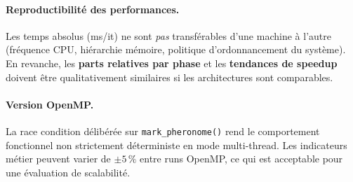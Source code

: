 \paragraph{Reproductibilité des performances.}
Les temps absolus (ms/it) ne sont \emph{pas} transférables d'une machine à l'autre
(fréquence CPU, hiérarchie mémoire, politique d'ordonnancement du système). En
revanche, les \textbf{parts relatives par phase} et les \textbf{tendances de speedup}
doivent être qualitativement similaires si les architectures sont comparables.

\paragraph{Version OpenMP.}
La race condition délibérée sur \texttt{mark\_pheronome()} rend le comportement
fonctionnel non strictement déterministe en mode multi-thread. Les indicateurs
métier peuvent varier de $\pm 5\,\%$ entre runs OpenMP, ce qui est acceptable
pour une évaluation de scalabilité.
